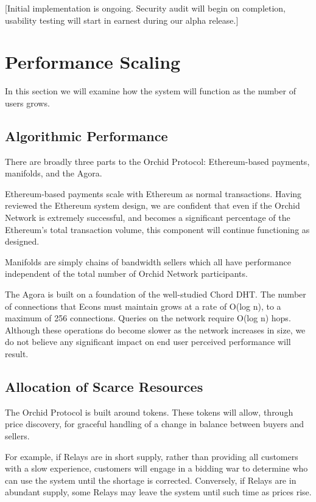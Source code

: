 \documentclass{article}
\newcommand{\orchid}{Orchid}
\newcommand{\Orchid}{\orchid}
\begin{document}
[Initial implementation is ongoing. Security audit will begin on
  completion, usability testing will start in earnest during our alpha
  release.]

\section{Performance Scaling}
\label{sec:performance}

In this section we will examine how the system will function as the
number of users grows.

\subsection{Algorithmic Performance}

There are broadly three parts to the \Orchid{} Protocol: Ethereum-based
payments, manifolds, and the Agora.

Ethereum-based payments scale with Ethereum as normal transactions.
Having reviewed the Ethereum system design, we are confident that even
if the \Orchid{} Network is extremely successful, and becomes a
significant percentage of the Ethereum's total transaction volume,
this component will continue functioning as designed.

Manifolds are simply chains of bandwidth sellers which all have
performance independent of the total number of \Orchid{} Network
participants.

The Agora is built on a foundation of the well-studied Chord DHT. The
number of connections that Econs must maintain grows at a rate of
O(log n), to a maximum of 256 connections. Queries on the network
require O(log n) hops. Although these operations do become slower as
the network increases in size, we do not believe any significant
impact on end user perceived performance will result.

\subsection{Allocation of Scarce Resources}

The \Orchid{} Protocol is built around tokens. These tokens will allow,
through price discovery, for graceful handling of a change in balance
between buyers and sellers.

For example, if Relays are in short supply, rather than providing all
customers with a slow experience, customers will engage in a bidding
war to determine who can use the system until the shortage is
corrected. Conversely, if Relays are in abundant supply, some Relays
may leave the system until such time as prices rise.
\end{document}
